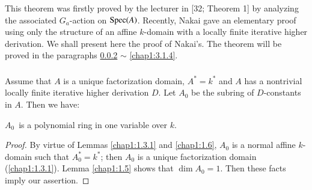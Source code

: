 \subsubsection{}\label{chap1:3.1.1}
This theorem was firstly proved by the lecturer in [32; Theorem 1] by
analyzing the associated $G_{a}$-action on $\operatorname{Spec}(A)$. Recently, Nakai
\cite{44} gave an elementary proof using only the structure of an
affine $k$-domain with a locally finite iterative higher
derivation. We shall present here the proof of Nakai's. The theorem
will be proved in the paragraphs \ref{chap1:3.1.2} $\sim$ \ref{chap1:3.1.4}.

\subsubsection{}\label{chap1:3.1.2}
Assume that $A$ is a unique factorization domain, $A^{\ast}=k^{\ast}$
and $A$ has a nontrivial locally finite iterative higher derivation
$D$. Let $A_{0}$ be the subring of $D$-constants in $A$. Then we have: 

\begin{lemma*}
$A_{0}$\pageoriginale\ is a polynomial ring in one variable over $k$.
\end{lemma*}

\begin{proof}
By virtue of Lemmas \ref{chap1:1.3.1} and \ref{chap1:1.6}, $A_{0}$ is a normal
affine $k$-domain such that $A^{\ast}_{0}=k^{\ast}$; then $A_{0}$ is a
unique factorization domain (\cf \ref{chap1:1.3.1}). Lemma \ref{chap1:1.5}
shows that $\dim A_{0}=1$. Then these facts imply our assertion.
\end{proof}

